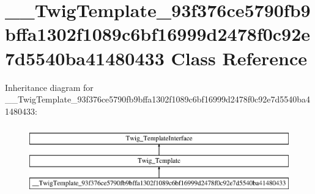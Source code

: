 \hypertarget{class_____twig_template__93f376ce5790fb9bffa1302f1089c6bf16999d2478f0c92e7d5540ba41480433}{}\section{\+\_\+\+\_\+\+Twig\+Template\+\_\+93f376ce5790fb9bffa1302f1089c6bf16999d2478f0c92e7d5540ba41480433 Class Reference}
\label{class_____twig_template__93f376ce5790fb9bffa1302f1089c6bf16999d2478f0c92e7d5540ba41480433}
Inheritance diagram for \+\_\+\+\_\+\+Twig\+Template\+\_\+93f376ce5790fb9bffa1302f1089c6bf16999d2478f0c92e7d5540ba41480433\+:\begin{figure}[H]
\begin{center}
\leavevmode
\includegraphics[height=3.000000cm]{class_____twig_template__93f376ce5790fb9bffa1302f1089c6bf16999d2478f0c92e7d5540ba41480433}
\end{center}
\end{figure}

